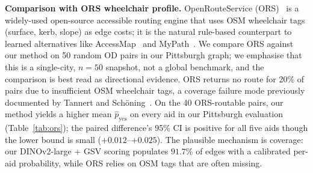 \documentclass[conference]{IEEEtran}
\begin{document}
\begin{table}[!t]
\caption{Accessibility-weighted routing vs.\ standard shortest path, Pittsburgh PA ($\beta_c = 8$, 91.7\% label-or-image edge-scoring coverage). Each aid finds a different optimal route.}
\label{tab:routing}
\centering\small
\setlength{\tabcolsep}{4pt}
\end{table}

\textbf{Comparison with ORS wheelchair profile.} OpenRouteService (ORS)~\cite{openrouteservice2026wheelchair} is a widely-used open-source accessible routing engine that uses OSM wheelchair tags (surface, kerb, slope) as edge costs; it is the natural rule-based counterpart to learned alternatives like AccessMap~\cite{bolten2017accessmap,bolten2019opensidewalks} and MyPath~\cite{saha2022mypath}. We compare ORS against our method on 50 random OD pairs in our Pittsburgh graph; we emphasise that this is a single-city, $n=50$ snapshot, not a global benchmark, and the comparison is best read as directional evidence. ORS returns no route for 20\% of pairs due to insufficient OSM wheelchair tags, a coverage failure mode previously documented by Tannert and Sch{\"o}ning~\cite{tannert2018wheelchair}. On the 40 ORS-routable pairs, our method yields a higher mean $\hat{p}_\mathrm{yes}$ on every aid in our Pittsburgh evaluation (Table~\ref{tab:ors}); the paired difference's 95\% CI is positive for all five aids though the lower bound is small ($+0.012$--$+0.025$). The plausible mechanism is coverage: our DINOv2-large + GSV scoring populates $91.7\%$ of edges with a calibrated per-aid probability, while ORS relies on OSM tags that are often missing.
\end{document}
